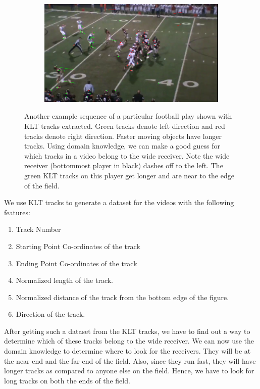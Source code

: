 \documentclass{article} %
\begin{document}
\begin{figure}
 \begin{subfigure}{.32\textwidth}
  \centering
  \includegraphics[width=1\linewidth]{img/137.png}
 \end{subfigure}\hspace{.5em}%
\caption{Another example sequence of a particular football play shown with KLT tracks extracted. Green tracks denote left direction and red tracks denote right direction. Faster moving objects have longer tracks. Using domain knowledge, we can make a good guess for which tracks in a video belong to the wide receiver. Note the wide receiver (bottommost player in black) dashes off to the left. The green KLT tracks on this player get longer and are near to the edge of the field.}
\label{fig:klt}
\end{figure}

We use KLT tracks to generate a dataset for the videos with the following features:

\begin{enumerate}
	\item Track Number
	\item Starting Point Co-ordinates of the track
	\item Ending Point Co-ordinates of the track
	\item Normalized length of the track.
	\item Normalized distance of the track from the bottom edge of the figure.
	\item Direction of the track.
\end{enumerate}

After getting such a dataset from the KLT tracks, we have to find out a way to determine which of these tracks belong to the wide receiver. We can now use the domain knowledge to determine where to look for the receivers. They will be at the near end and the far end of the field. Also, since they run fast, they will have longer tracks as compared to anyone else on the field. Hence, we have to look for long tracks on both the ends of the field.
\end{document}
